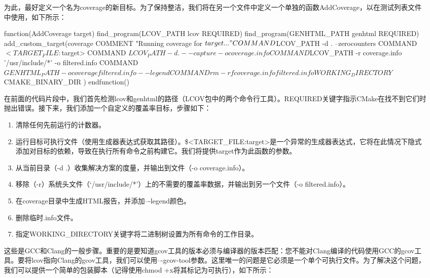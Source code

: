 为此，最好定义一个名为coverage的新目标。为了保持整洁，我们将在另一个文件中定义一个单独的函数AddCoverage，以在测试列表文件中使用，如下所示：


\begin{cmake}
function(AddCoverage target)
    find_program(LCOV_PATH lcov REQUIRED)
    find_program(GENHTML_PATH genhtml REQUIRED)
    add_custom_target(coverage
        COMMENT "Running coverage for ${target}..."
        COMMAND ${LCOV_PATH} -d . --zerocounters
        COMMAND $<TARGET_FILE:${target}>
        COMMAND ${LCOV_PATH} -d . --capture -o coverage.info
        COMMAND ${LCOV_PATH} -r coverage.info '/usr/include/*'
                             -o filtered.info
        COMMAND ${GENHTML_PATH} -o coverage filtered.info
            --legend
        COMMAND rm -rf coverage.info filtered.info
        WORKING_DIRECTORY ${CMAKE_BINARY_DIR}
    )
endfunction()
\end{cmake}

在前面的代码片段中，我们首先检测lcov和genhtml的路径（LCOV包中的两个命令行工具）。REQUIRED关键字指示CMake在找不到它们时抛出错误。接下来，我们添加一个自定义的覆盖率目标，步骤如下：

\begin{enumerate}
\item
清除任何先前运行的计数器。

\item
运行目标可执行文件（使用生成器表达式获取其路径）。\$<TARGET\_FILE:target>是一个异常的生成器表达式，它将在此情况下隐式添加对目标的依赖，导致在执行所有命令之前构建它。我们将提供target作为此函数的参数。

\item
从当前目录（-d .）收集解决方案的度量，并输出到文件（-o coverage.info）。

\item
 移除（-r）系统头文件（‘/usr/include/*’）上的不需要的覆盖率数据，并输出到另一个文件（-o filtered.info）。

\item
在coverage目录中生成HTML报告，并添加–{}-legend颜色。

\item
删除临时.info文件。

\item
指定WORKING\_DIRECTORY关键字将二进制树设置为所有命令的工作目录。
\end{enumerate}

这些是GCC和Clang的一般步骤。重要的是要知道gcov工具的版本必须与编译器的版本匹配：您不能对Clang编译的代码使用GCC的gcov工具。要将lcov指向Clang的gcov工具，我们可以使用–{}-gcov-tool参数。这里唯一的问题是它必须是一个单个可执行文件。为了解决这个问题，我们可以提供一个简单的包装脚本（记得使用chmod +x将其标记为可执行），如下所示：

